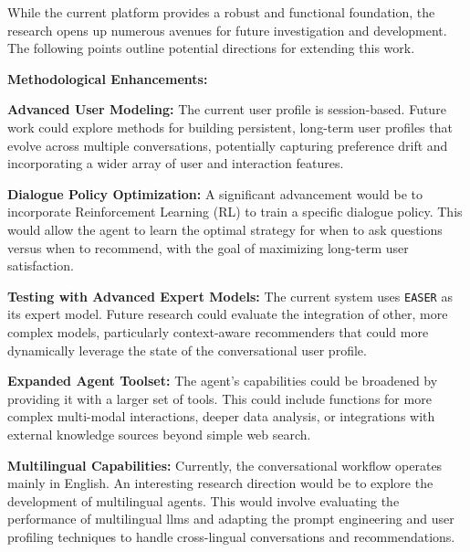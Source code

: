 While the current platform provides a robust and functional foundation, the research opens up numerous avenues for future investigation and development. The following points outline potential directions for extending this work.

\begin{compactitem}[\textbullet]
    \item \textbf{Methodological Enhancements:}
    \begin{compactenum}
        \item \textbf{Advanced User Modeling:} The current user profile is session-based. Future work could explore methods for building persistent, long-term user profiles that evolve across multiple conversations, potentially capturing preference drift and incorporating a wider array of user and interaction features.
        \item \textbf{Dialogue Policy Optimization:} A significant advancement would be to incorporate Reinforcement Learning (RL) to train a specific dialogue policy. This would allow the agent to learn the optimal strategy for when to ask questions versus when to recommend, with the goal of maximizing long-term user satisfaction.
        \item \textbf{Testing with Advanced Expert Models:} The current system uses \texttt{EASER} as its expert model. Future research could evaluate the integration of other, more complex models, particularly context-aware recommenders that could more dynamically leverage the state of the conversational user profile.
        \item \textbf{Expanded Agent Toolset:} The agent's capabilities could be broadened by providing it with a larger set of tools. This could include functions for more complex multi-modal interactions, deeper data analysis, or integrations with external knowledge sources beyond simple web search.
        \item \textbf{Multilingual Capabilities:} Currently, the conversational workflow operates mainly in English. An interesting research direction would be to explore the development of multilingual agents. This would involve evaluating the performance of multilingual \acp{llm} and adapting the prompt engineering and user profiling techniques to handle cross-lingual conversations and recommendations.
    \end{compactenum}


\end{compactitem}
